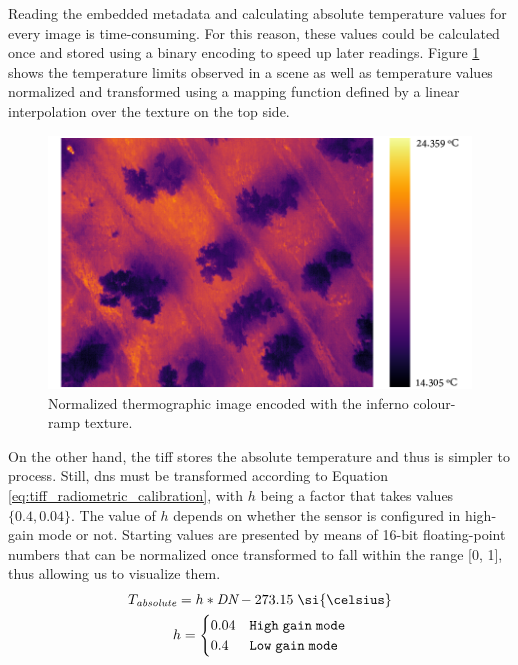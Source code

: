 

Reading the embedded metadata and calculating absolute temperature values for every image is time-consuming. For this reason, these values could be calculated once and stored using a binary encoding to speed up later readings. Figure \ref{fig:thermal_inferno_temperature} shows the temperature limits observed in a scene as well as temperature values normalized and transformed using a mapping function defined by a linear interpolation over the texture on the top side.

\begin{figure}[ht]
	\centering
	\includegraphics{figs/materials/thermal_inferno_temperature.png}
	\caption{Normalized thermographic image encoded with the inferno colour-ramp texture. }
	\label{fig:thermal_inferno_temperature}
\end{figure}

On the other hand, the \acrshort{tiff} stores the absolute temperature and thus is simpler to process. Still, \acrshort{dn}s must be transformed according to Equation \ref{eq:tiff_radiometric_calibration}, with $h$ being a factor that takes values $\{0.4, 0.04\}$. The value of $h$ depends on whether the sensor is configured in high-gain mode or not. Starting values are presented by means of 16-bit floating-point numbers that can be normalized once transformed to fall within the range [0, 1], thus allowing us to visualize them.
\begin{gather}
    \label{eq:tiff_radiometric_calibration}
    \begin{aligned}
        T_{\textit{absolute}} &= h * \textit{DN} - 273.15 \hspace{1mm} \si{\celsius}\\
    \end{aligned}\\
    h=\begin{cases}
        0.04 &\mathtt{High \hspace{1mm} gain \hspace{1mm} mode}\\
        0.4 &\mathtt{Low \hspace{1mm} gain \hspace{1mm} mode}\\
    \end{cases}
\end{gather}


